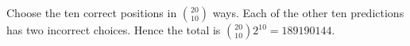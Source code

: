 Choose the ten correct positions in $\binom{20}{10}$ ways. Each of the other ten predictions has two incorrect choices. Hence the total is $\binom{20}{10}2^{10}=\boxed{189190144}$.
